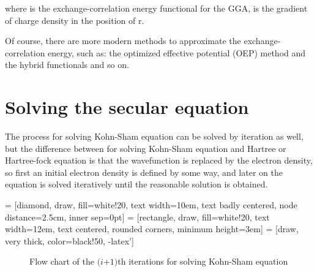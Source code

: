\documentclass[a4paper, 12pt, titlepage,oneside,drop]{kthesis}
\begin{document}
\noindent where  is the exchange-correlation energy functional for the GGA,  is the gradient  of charge density in the position of r.

\noindent Of course, there are more modern methods to approximate the exchange-correlation energy, such as: the optimized effective potential
(OEP) method and the hybrid functionals and so on.

\section{Solving the secular equation}
\noindent The process for solving Kohn-Sham equation can be solved by iteration as well, but the difference between for solving Kohn-Sham 
equation and Hartree or Hartree-fock equation is that the wavefunction is replaced by the electron density, so first an initial 
electron density is defined by some way, and later on the equation is solved iteratively until the reasonable solution is obtained.

 = [diamond, draw, fill=white!20,
    text width=10em, text badly centered, node distance=2.5cm, inner sep=0pt]
 = [rectangle, draw, fill=white!20,
    text width=12em, text centered, rounded corners, minimum height=3em]
 = [draw, very thick, color=black!50, -latex']

\begin{figure}[!htb]
\centering


\caption{Flow chart of the ${\textit {(i+1)}}$th iterations for solving Kohn-Sham equation}
\label{fig:bo}
\end{figure}
\end{document}
